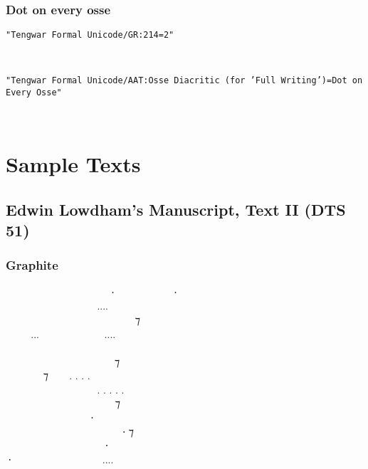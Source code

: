 \documentclass[11pt,a4paper]{article}
\begin{document}
\formalAATosseambiguous  



\subsubsection*{Dot on every osse}


\texttt{"Tengwar Formal Unicode/GR:214=2"}

\formalGRosseevery  

\noindent \texttt{"Tengwar Formal Unicode/AAT:Osse Diacritic (for 'Full Writing')=Dot on Every Osse"}

\formalAATosseevery  



\newpage



\section{Sample Texts}


\subsection{Edwin Lowdham’s Manuscript, Text II (DTS 51)}

\subsubsection*{Graphite}

\formalGR

  ‍   ⸱‍  ‍ ⸱ \\
    ‍....  ‍  \\
  ‍   ‍ ‍ ⁊ ‍  \\
...  ....   \\
         ‍ \\
 ‍ ‍‍   ⁊  ‍ ‍ \\
 ‍ ⁊  . . . .  ‍ ‍‍   \\
   ‍ . . . . . ‍ ‍   \\
      ⁊    \\
   ‍⸱‍   ‍  \\
     ‍⸱ ⁊  ‍ \\
    ⸱    \\
⸱  ‍  .... ‍‍    \\
\end{document}
